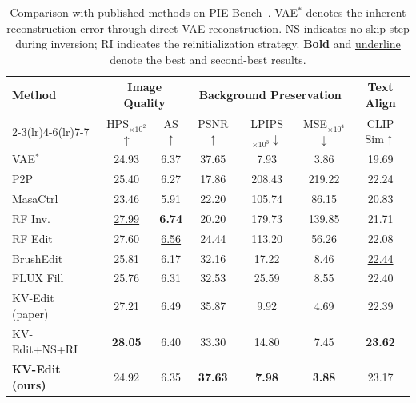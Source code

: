 \begin{table}[t]
\centering
\caption{Comparison with published methods on PIE-Bench~\cite{piebench2024}.
VAE$^*$ denotes the inherent reconstruction error through direct VAE reconstruction.
NS indicates no skip step during inversion; RI indicates the reinitialization strategy.
\textbf{Bold} and \underline{underline} denote the best and second-best results.}
\label{tab:comparison}
\setlength{\tabcolsep}{5pt}
\small
\begin{tabular}{lcccccc}
\toprule
\multirow{2}{*}{Method}
  & \multicolumn{2}{c}{Image Quality}
  & \multicolumn{3}{c}{Background Preservation}
  & \multicolumn{1}{c}{Text Align} \\
\cmidrule(lr){2-3}\cmidrule(lr){4-6}\cmidrule(lr){7-7}
  & HPS$_{{\times}10^2}$$\uparrow$
  & AS$\uparrow$
  & PSNR$\uparrow$
  & LPIPS$_{{\times}10^3}$$\downarrow$
  & MSE$_{{\times}10^4}$$\downarrow$
  & CLIP Sim$\uparrow$ \\
\midrule
VAE$^*$     & 24.93 & 6.37 & 37.65 &  7.93 &  3.86 & 19.69 \\
\midrule
P2P~\cite{hertz2022p2p}
            & 25.40 & 6.27 & 17.86 & 208.43 & 219.22 & 22.24 \\
MasaCtrl~\cite{cao2023masactrl}
            & 23.46 & 5.91 & 22.20 & 105.74 &  86.15 & 20.83 \\
RF Inv.~\cite{rfedi2024}
            & \underline{27.99} & \textbf{6.74} & 20.20 & 179.73 & 139.85 & 21.71 \\
RF Edit~\cite{rfedi2024}
            & 27.60 & \underline{6.56} & 24.44 & 113.20 &  56.26 & 22.08 \\
BrushEdit~\cite{brushedit2024}
            & 25.81 & 6.17 & 32.16 &  17.22 &   8.46 & \underline{22.44} \\
FLUX Fill~\cite{bfl2024}
            & 25.76 & 6.31 & 32.53 &  25.59 &   8.55 & 22.40 \\
\midrule
KV-Edit (paper)~\cite{zhu2025kvedit}
            & 27.21 & 6.49 & 35.87 &   9.92 &   4.69 & 22.39 \\
KV-Edit+NS+RI~\cite{zhu2025kvedit}
            & \textbf{28.05} & 6.40 & 33.30 &  14.80 &   7.45 & \textbf{23.62} \\
\midrule
\textbf{KV-Edit (ours)}
            & 24.92 & 6.35 & \textbf{37.63} & \textbf{7.98} & \textbf{3.88} & 23.17 \\
\bottomrule
\end{tabular}
\end{table}

